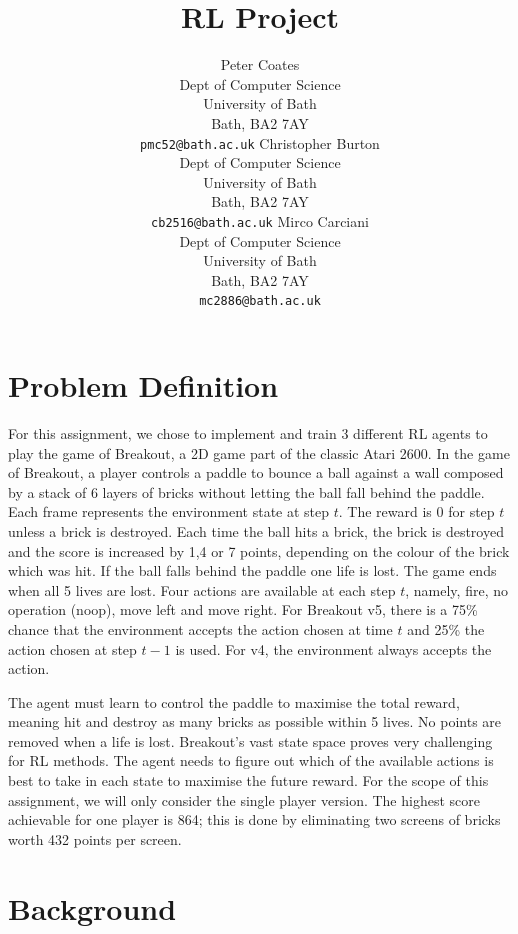 \documentclass{article}
\title{RL Project}
\author{
  Peter Coates  \\
  Dept of Computer Science\\
  University of Bath\\
  Bath, BA2 7AY \\
  \texttt{pmc52@bath.ac.uk}
\And
  Christopher Burton\\
  Dept of Computer Science\\
  University of Bath \\
  Bath, BA2 7AY\\
  \texttt{cb2516@bath.ac.uk}
\And
  Mirco Carciani\\
  Dept of Computer Science\\
  University of Bath \\
  Bath, BA2 7AY\\
  \texttt{mc2886@bath.ac.uk}
}
\begin{document}
\maketitle

\section{Problem Definition}

For this assignment, we chose to implement and train 3 different RL agents to play the game of Breakout, a 2D game part of the classic Atari 2600.
In the game of Breakout, a player controls a paddle to bounce a ball against a wall composed by a stack of 6 layers of bricks without letting the ball fall behind the paddle. Each frame represents the environment state at step $t$. The reward is 0 for step $t$ unless a brick is destroyed. Each time the ball hits a brick, the brick is destroyed and the score is increased by 1,4 or 7 points, depending on the colour of the brick which was hit. If the ball falls behind the paddle one life is lost. The game ends when all 5 lives are lost.
Four actions are available at each step $t$, namely, fire, no operation (noop), move left and move right. For Breakout v5, there is a 75\% chance that the environment accepts the action chosen at time $t$ and 25\% the action chosen at step $t-1$ is used. For v4, the environment always accepts the action.

The agent must learn to control the paddle to maximise the total reward, meaning hit and destroy as many bricks as possible within 5 lives. No points are removed when a life is lost. Breakout's vast state space proves very challenging for RL methods. The agent needs to figure out which of the available actions is best to take in each state to maximise the future reward. For the scope of this assignment, we will only consider the single player version. The highest score achievable for one player is 864; this is done by eliminating two screens of bricks worth 432 points per screen. 

\section{Background}

\end{document}
